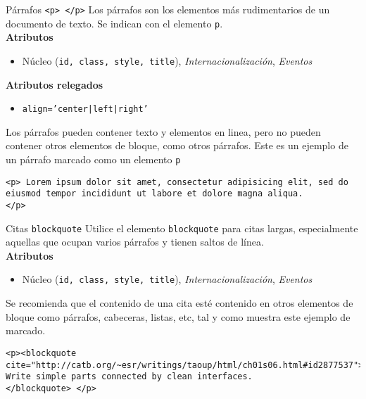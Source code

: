\begin{frame}[fragile]{Párrafos \texttt{<p> </p>}} %
    Los párrafos son los elementos más rudimentarios de un documento de texto.
    Se indican con el elemento \texttt{p}.\\[0.1cm]

    \textbf{Atributos}
    \begin{itemize}
        \item Núcleo (\texttt{id, class, style, title}),
        \textit{Internacionalización},  \textit{Eventos}
    \end{itemize}
    \textbf{Atributos relegados}
    \begin{itemize}
        \item \texttt{align='center|left|right'}
    \end{itemize}

    Los párrafos pueden contener texto y elementos en linea, pero no pueden
    contener otros elementos de bloque, como otros párrafos. Este es un ejemplo
    de un párrafo marcado como un elemento \texttt{p}

    \begin{lstlisting}
<p> Lorem ipsum dolor sit amet, consectetur adipisicing elit, sed do eiusmod tempor incididunt ut labore et dolore magna aliqua.
</p> 
    \end{lstlisting}

\end{frame}

\begin{frame}[fragile]{Citas \texttt{blockquote}} %
    Utilice el elemento \texttt{blockquote} para citas largas, especialmente
    aquellas que ocupan varios párrafos y tienen saltos de línea. \\[0.5cm]
    \textbf{Atributos}
    \begin{itemize}
        \item Núcleo (\texttt{id, class, style, title}),
        \textit{Internacionalización},  \textit{Eventos}
    \end{itemize}
    Se recomienda que el contenido de una cita esté contenido en otros
    elementos de bloque como párrafos, cabeceras, listas, etc, tal y como
    muestra este ejemplo de marcado. 

    \begin{lstlisting}
<p><blockquote
cite="http://catb.org/~esr/writings/taoup/html/ch01s06.html#id2877537"> 
Write simple parts connected by clean interfaces.
</blockquote> </p>
    \end{lstlisting}
\end{frame}

